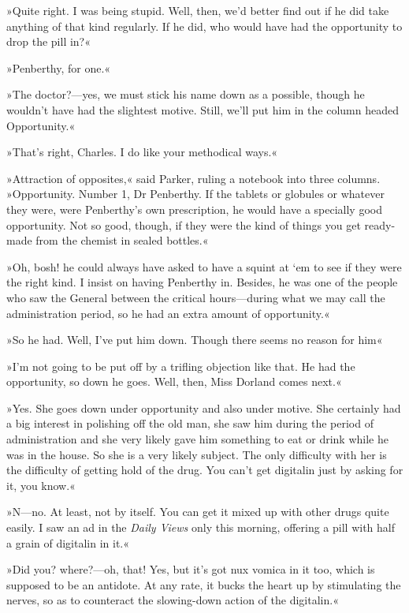 »Quite right. I was being stupid. Well, then, we'd better find out if he did take anything of that kind regularly. If he did, who would have had the opportunity to drop the pill in?«

»Penberthy, for one.«

»The doctor?—yes, we must stick his name down as a possible, though he wouldn't have had the slightest motive. Still, we'll put him in the column headed Opportunity.«

»That's right, Charles. I do like your methodical ways.«

»Attraction of opposites,« said Parker, ruling a notebook into three columns. »Opportunity. Number 1, Dr Penberthy. If the tablets or globules or whatever they were, were Penberthy's own prescription, he would have a specially good opportunity. Not so good, though, if they were the kind of things you get ready-made from the chemist in sealed bottles.«

»Oh, bosh! he could always have asked to have a squint at `em to see if they were the right kind. I insist on having Penberthy in. Besides, he was one of the people who saw the General between the critical hours—during what we may call the administration period, so he had an extra amount of opportunity.«

»So he had. Well, I've put him down. Though there seems no reason for him\longdash«

»I'm not going to be put off by a trifling objection like that. He had the opportunity, so down he goes. Well, then, Miss Dorland comes next.«

»Yes. She goes down under opportunity and also under motive. She certainly had a big interest in polishing off the old man, she saw him during the period of administration and she very likely gave him something to eat or drink while he was in the house. So she is a very likely subject. The only difficulty with her is the difficulty of getting hold of the drug. You can't get digitalin just by asking for it, you know.«

»N—no. At least, not by itself. You can get it mixed up with other drugs quite easily. I saw an ad in the \textit{Daily Views} only this morning, offering a pill with half a grain of digitalin in it.«

»Did you? where?—oh, that! Yes, but it's got nux vomica in it too, which is supposed to be an antidote. At any rate, it bucks the heart up by stimulating the nerves, so as to counteract the slowing-down action of the digitalin.«

